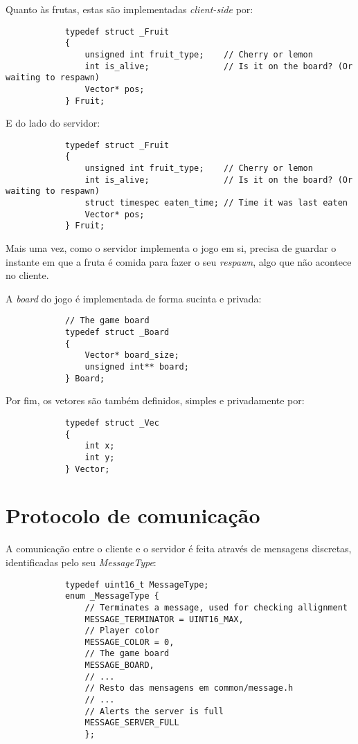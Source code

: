 \documentclass[a4paper]{report}
\begin{document}
        \par Quanto às frutas, estas são implementadas \textit{client-side} por:
        \begin{lstlisting}
            typedef struct _Fruit
            {
                unsigned int fruit_type;    // Cherry or lemon
                int is_alive;               // Is it on the board? (Or waiting to respawn)
                Vector* pos;
            } Fruit;
        \end{lstlisting}
        \par E do lado do servidor:
        \begin{lstlisting}
            typedef struct _Fruit
            {
                unsigned int fruit_type;    // Cherry or lemon
                int is_alive;               // Is it on the board? (Or waiting to respawn)
                struct timespec eaten_time; // Time it was last eaten
                Vector* pos;
            } Fruit;
        \end{lstlisting}
        \par Mais uma vez, como o servidor implementa o jogo em si, precisa de guardar o instante em que a fruta é comida para fazer o seu \textit{respawn}, algo que não acontece no cliente.

        \par A \textit{board} do jogo é implementada de forma sucinta e privada:
        \begin{lstlisting}
            // The game board
            typedef struct _Board
            {
                Vector* board_size;
                unsigned int** board;
            } Board;
        \end{lstlisting}

        \par Por fim, os vetores são também definidos, simples e privadamente por:
        \begin{lstlisting}
            typedef struct _Vec
            {
                int x;
                int y;
            } Vector;
        \end{lstlisting}
    
    \section{Protocolo de comunicação}

        \par A comunicação entre o cliente e o servidor é feita através de mensagens discretas, identificadas pelo seu \textit{MessageType}:
        \begin{lstlisting}
            typedef uint16_t MessageType;
            enum _MessageType {
                // Terminates a message, used for checking allignment
                MESSAGE_TERMINATOR = UINT16_MAX, 
                // Player color
                MESSAGE_COLOR = 0, 
                // The game board
                MESSAGE_BOARD,
                // ...
                // Resto das mensagens em common/message.h
                // ...
                // Alerts the server is full
                MESSAGE_SERVER_FULL
                };
        \end{lstlisting}
\end{document}
